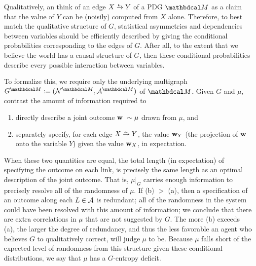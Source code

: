 \documentclass{article}
\begin{document}
Qualitatively, an think of an edge $\ed LXY$ of a PDG $\dg M$ as a claim that the value of $Y$ can be (noisily) computed from
$X$ alone.  
Therefore, to best match the qualitative structure of $G$, statistical asymmetries and dependencies between variables should
be efficiently described by giving the conditional probabilities corresponding to the edges of $G$. After all, to the extent that we believe the world has a causal structure of $G$, then these conditional probabilities describe every possible interaction between variables. 

To formalize this, we require only the underlying multigraph $G^{\dg M} :=
(\N^{\dg M}, \Ed^{\dg M})$ of $\dg M$. 
Given $G$ and $\mu$, contrast the amount of
information required to 
\begin{enumerate}[label=(\alph*)]
	\item directly describe a joint outcome  $\mathbf w ~ \sim \mu$
	drawn from $\mu$, and 
	\item separately specify, for each edge $\ed LXY$, the value
	$\mathbf w_Y$ (the projection of $\mathbf w$ onto the variable
	$Y$) given the value $\mathbf w_X$, in expectation. 
\end{enumerate}
When these two quantities are equal, the total length (in expectation) of specifying the outcome on each link, is precisely the same length as an optimal description of the joint outcome. That is, $\mu|_G$ carries enough information to precisely resolve all of the randomness of $\mu$. If (b) $>$ (a), then a specification of an outcome along each $L \in \mathcal A$ is redundant; all of the randomness in the system could have been resolved with this amount of information; we conclude that there are extra correlations in $\mu$ that are not suggested by $G$. The more (b) exceeds (a), the larger the degree of redundancy, and thus the less favorable an agent who believes $G$ to qualitatively correct, will judge $\mu$ to be. Because $\mu$ falls short of the expected level of randomness from this structure given these conditional distributions, we say that $\mu$ has a $G$-entropy deficit.
\end{document}
